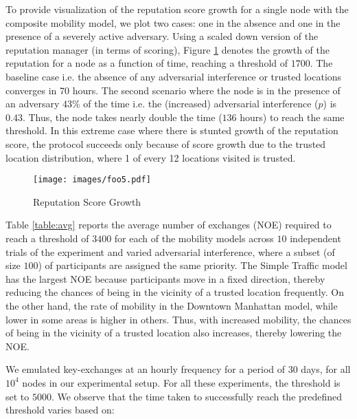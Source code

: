 \documentclass[letterpaper,twocolumn]{sig-alternate}
\begin{document}
 To provide visualization of the reputation score growth for a single node with the composite mobility model, we plot two cases: one in the absence and one in the presence of a severely active adversary. Using a scaled down version of the reputation manager (in terms of scoring), Figure \ref{fig:RSG} denotes the growth of the reputation for a node as a function of time, reaching a threshold of $1700$. The baseline case i.e. the absence of any adversarial interference or trusted locations converges in 70 hours. The second scenario where the node is in the presence of an adversary 43\% of the time i.e. the (increased) adversarial interference ($p$) is $0.43$. Thus, the node takes nearly double the time ($136$ hours) to reach the same threshold. In this extreme case where there is stunted growth of the reputation score, the protocol succeeds only because of score growth due to the trusted location distribution, where 1 of every 12 locations visited is trusted. 

\begin{figure}[!h]
  \begin{center}
      \texttt{[image: images/foo5.pdf]}
    \end{center}
\vspace{-0.1in}
  \caption{\small{Reputation Score Growth}}
  \label{fig:RSG}
 \vspace{-0.1in}
\end{figure}


\vspace{1mm}
 Table \ref{table:avg} reports the average number of exchanges (NOE) required to reach a threshold of $3400$ for each of the mobility models across $10$ independent trials of the experiment and varied adversarial interference, where a subset (of size $100$) of participants are assigned the same priority. The Simple Traffic model has the largest NOE because participants move in a fixed direction, thereby reducing the chances of being in the vicinity of a trusted location frequently. On the other hand, the rate of mobility in the Downtown Manhattan model, while lower in some areas is higher in others. Thus, with increased mobility, the chances of being in the vicinity of a trusted location also increases, thereby lowering the NOE. 

\vspace{1mm}
 We emulated key-exchanges at an hourly frequency for a period of 30 days, for all $10^4$ nodes in our experimental setup. For all these experiments, the threshold is set to $5000$. We observe that the time taken to successfully reach the predefined threshold varies based on: 
\end{document}

